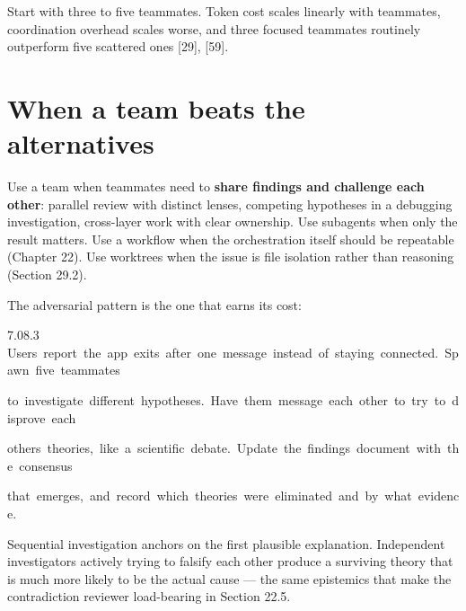 \documentclass[11pt,a4paper,twoside,openany]{book}
\newcommand{\cl}[1]{\noindent\mbox{#1}\par}
\begin{document}
Start with three to five teammates. Token cost scales linearly with teammates, coordination overhead scales worse, and three focused teammates routinely outperform five scattered ones [29], [59].


\FloatBarrier
\setcounter{section}{6}
\section{When a team beats the alternatives}

Use a team when teammates need to \textbf{share findings and challenge each other}: parallel review with distinct lenses, competing hypotheses in a debugging investigation, cross-layer work with clear ownership. Use subagents when only the result matters. Use a workflow when the orchestration itself should be repeatable (Chapter 22). Use worktrees when the issue is file isolation rather than reasoning (Section 29.2).


The adversarial pattern is the one that earns its cost:


\begin{codeblock}{7.0}{8.3}
\cl{Users~report~the~app~exits~after~one~message~instead~of~staying~connected.~Spawn~five~teammates}
\cl{to~investigate~different~hypotheses.~Have~them~message~each~other~to~try~to~disprove~each}
\cl{other\textquotesingle{}s~theories,~like~a~scientific~debate.~Update~the~findings~document~with~the~consensus}
\cl{that~emerges,~and~record~which~theories~were~eliminated~and~by~what~evidence.}
\end{codeblock}

Sequential investigation anchors on the first plausible explanation. Independent investigators actively trying to falsify each other produce a surviving theory that is much more likely to be the actual cause — the same epistemics that make the contradiction reviewer load-bearing in Section 22.5.
\end{document}

